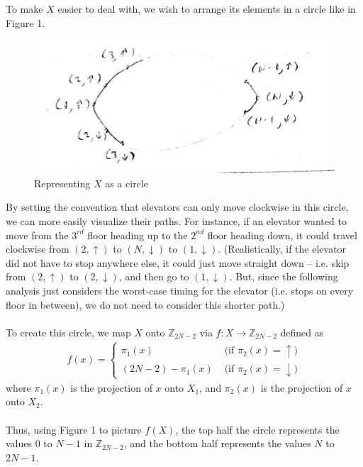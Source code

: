 \documentclass[letterpaper]{article} %
\begin{document}
To make $X$ easier to deal with, we wish to arrange its elements in a circle like in Figure 1.
\begin{figure}
  \centering
    \includegraphics[scale=0.2]{circle}
  \caption{Representing $X$ as a circle}
\end{figure}
By setting the convention that elevators can only move clockwise in this circle, we can more easily visualize their paths. For instance, if an elevator wanted to move from the $3^{rd}$ floor heading up to the $2^{nd}$ floor heading down, it could travel clockwise from $(2, \uparrow)$ to $(N, \downarrow)$ to $(1, \downarrow)$. (Realistically, if the elevator did not have to stop anywhere else, it could just move straight down -- i.e. skip from $(2, \uparrow)$ to $(2, \downarrow)$, and then go to $(1, \downarrow)$. But, since the following analysis just considers the worst-case timing for the elevator (i.e. stops on every floor in between), we do not need to consider this shorter path.)\\\\
To create this circle, we map $X$ onto $\mathbb{Z}_{2N - 2}$ via $f: X \rightarrow \mathbb{Z}_{2N - 2}$ defined as \\
\begin{align*}
    f(x)=\left\{
                \begin{array}{ll}
                  \pi_{1}(x) &\text{ (if $\pi_2(x) = \uparrow$)}\\
                  (2N - 2) - \pi_{1}(x) &\text{ (if $\pi_2(x) = \downarrow$)}
                \end{array}
              \right.
\end{align*}
where $\pi_{1}(x)$ is the projection of $x$ onto $X_1$, and $\pi_{2}(x)$ is the projection of $x$ onto $X_2$. \\\\
Thus, using Figure 1 to picture $f(X)$, the top half the circle represents the values $0$ to $N - 1$ in $\mathbb{Z}_{2N - 2}$, and the bottom half represents the values $N$ to $2N - 1$.
\end{document}
